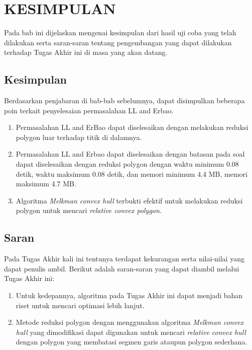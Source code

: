 \chapter{KESIMPULAN}
Pada bab ini dijelaskan mengenai kesimpulan dari hasil uji coba yang telah dilakukan serta saran-saran tentang pengembangan yang dapat dilakukan terhadap Tugas Akhir ini di masa yang akan datang.
\section{Kesimpulan}
Berdasarkan penjabaran di bab-bab sebelumnya, dapat disimpulkan beberapa poin terkait penyelesaian permasalahan LL and Erbao.
\begin{enumerate}
\item Permasalahan LL and ErBao dapat diselesaikan dengan melakukan reduksi polygon luar terhadap titik di dalamnya.
\item Permasalahan LL and Erbao dapat diselesaikan dengan batasan pada soal dapat diselesaikan dengan reduksi polygon dengan waktu minimum 0.08 detik, waktu maksimum 0.08 detik, dan memori minimum 4.4 MB, memori maksimum 4.7 MB.
\item Algoritma \textit{Melkman convex hull} terbukti efektif untuk melakukan reduksi polygon untuk mencari \textit{relative convex polygon}.
\end{enumerate}
\section{Saran}
Pada Tugas Akhir kali ini tentunya terdapat kekurangan serta nilai-nilai yang dapat penulis ambil. Berikut adalah saran-saran yang dapat diambil melalui Tugas Akhir ini:
\begin{enumerate}
 \item Untuk kedepannya, algoritma pada Tugas Akhir ini dapat menjadi bahan riset untuk mencari optimasi lebih lanjut.
 \item Metode reduksi polygon dengan menggunakan algoritma \textit{Melkman convex hull} yang dimodifikasi dapat digunakan untuk mencari \textit{relative convex hull} dengan polygon yang membatasi segmen garis ataupun polygon sederhana.
\end{enumerate}